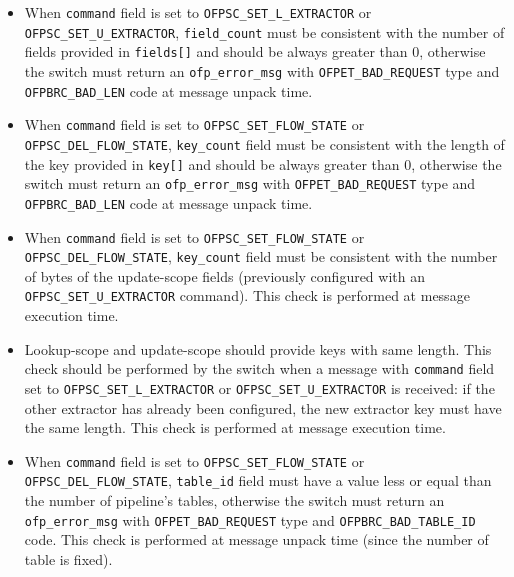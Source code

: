 \begin{itemize}
    \item When \texttt{command} field is set to \texttt{OFPSC\_SET\_L\_EXTRACTOR} or \texttt{OFPSC\_SET\_U\_EXTRACTOR}, \texttt{field\_count} must be consistent with the number of fields provided in \texttt{fields[]} and should be always greater than 0, otherwise the switch must return an \texttt{ofp\_error\_msg} with \texttt{OFPET\_BAD\_REQUEST} type and \texttt{OFPBRC\_BAD\_LEN} code at message unpack time.

    \item When \texttt{command} field is set to \texttt{OFPSC\_SET\_FLOW\_STATE} or \texttt{OFPSC\_DEL\_FLOW\_STATE}, \texttt{key\_count} field must be consistent with the length of the key provided in \texttt{key[]} and should be always greater than 0, otherwise the switch must return an \texttt{ofp\_error\_msg} with \texttt{OFPET\_BAD\_REQUEST} type and \texttt{OFPBRC\_BAD\_LEN} code at message unpack time.

    \item When \texttt{command} field is set to \texttt{OFPSC\_SET\_FLOW\_STATE} or \texttt{OFPSC\_DEL\_FLOW\_STATE}, \texttt{key\_count} field must be consistent with the number of bytes of the update-scope fields (previously configured with an \texttt{OFPSC\_SET\_U\_EXTRACTOR} command). This check is performed at message execution time.

    \item Lookup-scope and update-scope should provide keys with same length. This check should be performed by the switch when a message with \texttt{command} field set to \texttt{OFPSC\_SET\_L\_EXTRACTOR} or \texttt{OFPSC\_SET\_U\_EXTRACTOR} is received: if the other extractor has already been configured, the new extractor key must have the same length. This check is performed at message execution time.

    \item When \texttt{command} field is set to \texttt{OFPSC\_SET\_FLOW\_STATE} or \texttt{OFPSC\_DEL\_FLOW\_STATE}, \texttt{table\_id} field must have a value less or equal than the number of pipeline’s tables, otherwise the switch must return an \texttt{ofp\_error\_msg} with \texttt{OFPET\_BAD\_REQUEST} type and \texttt{OFPBRC\_BAD\_TABLE\_ID} code. This check is performed at message unpack time (since the number of table is fixed).
\end{itemize}

